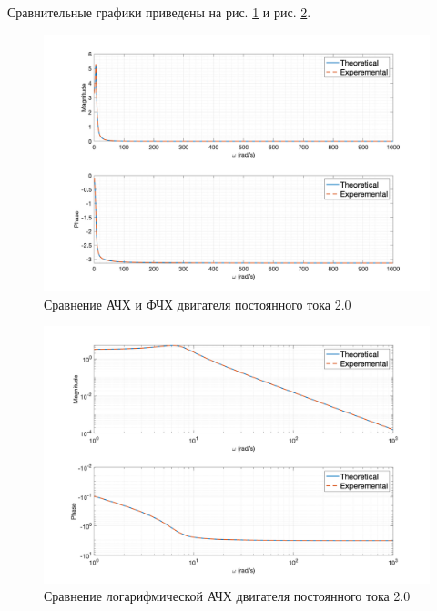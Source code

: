 Сравнительные графики приведены на рис. \ref{fig:task2_freq_resp_cmp_lin} и рис. \ref{fig:task2_freq_resp_cmp_loglog}.
\begin{figure}[ht!]
    \centering
    \includegraphics[width=\textwidth]{media/plots/task2_freq_resp_cmp_lin.png}
    \caption{Сравнение АЧХ и ФЧХ двигателя постоянного тока 2.0}
    \label{fig:task2_freq_resp_cmp_lin}
\end{figure}
\begin{figure}[ht!]
    \centering
    \includegraphics[width=\textwidth]{media/plots/task2_freq_resp_cmp_loglog.png}
    \caption{Сравнение логарифмической АЧХ двигателя постоянного тока 2.0}
    \label{fig:task2_freq_resp_cmp_loglog}
\end{figure}


